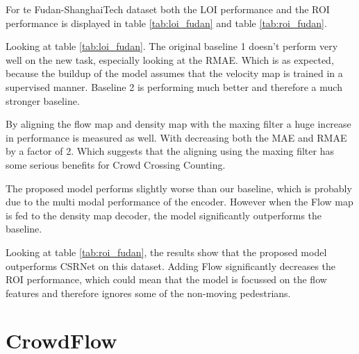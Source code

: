 For te Fudan-ShanghaiTech dataset both the LOI performance and the ROI performance is displayed in table \ref{tab:loi_fudan} and table \ref{tab:roi_fudan}.

Looking at table \ref{tab:loi_fudan}. The original baseline 1 doesn't perform very well on the new task, especially looking at the RMAE. Which is as expected, because the buildup of the model assumes that the velocity map is trained in a supervised manner. Baseline 2 is performing much better and therefore a much stronger baseline.

By aligning the flow map and density map with the maxing filter a huge increase in performance is measured as well. With decreasing both the MAE and RMAE by a factor of 2. Which suggests that the aligning using the maxing filter has some serious benefits for Crowd Crossing Counting.

The proposed model performs slightly worse than our baseline, which is probably due to the multi modal performance of the encoder. However when the Flow map is fed to the density map decoder, the model significantly outperforms the baseline.

Looking at table \ref{tab:roi_fudan}, the results show that the proposed model outperforms CSRNet \cite{li2018csrnet} on this dataset. Adding Flow significantly decreases the ROI performance, which could mean that the model is focussed on the flow features and therefore ignores some of the non-moving pedestrians.

\section{CrowdFlow}

